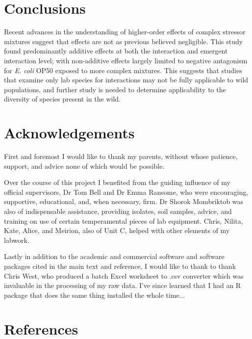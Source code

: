 \documentclass[review,12pt]{elsarticle}
\begin{document}
\section{Conclusions}
\label{S:5}

Recent advances in the understanding of higher-order effects of complex stressor mixtures suggest that effects are not as previous believed negligible. This study found predominantly additive effects at both the interaction and emergent interaction level; with non-additive effects largely limited to negative antagonism for \textit{E. coli} OP50 exposed to more complex mixtures. This suggests that studies that examine only lab species for interactions may not be fully applicable to wild populations, and further study is needed to determine applicability to the diversity of species present in the wild.

\section{Acknowledgements}
\label{S:6}
First and foremost I would like to thank my parents, without whose patience, support, and advice none of which would be possible.

Over the course of this project I benefited from the guiding influence of my official supervisors, Dr Tom Bell and Dr Emma Ransome, who were encouraging, supportive, educational, and, when necessary, firm. Dr Shorok Mombriktob was also of indispensable assistance, providing isolates, soil samples, advice, and training on use of certain temperamental pieces of lab equipment. Chris,  Nilita, Kate, Alice, and Meirion, also of Unit C, helped with other elements of my labwork.

Lastly in addition to the academic and commercial software and software packages cited in the main text and reference, I would like to thank to thank Chris West, who produced a batch Excel worksheet to .csv converter which was invaluable in the processing of my raw data. I've since learned that I had an R package that does the same thing installed the whole time...

\section{References}
\label{S:7}

\end{document}
